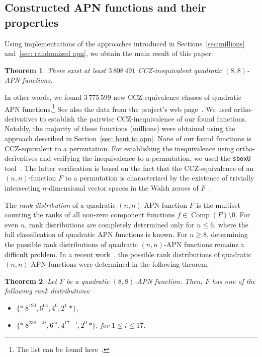 \documentclass{amsart}[11pt]
\theoremstyle{plain}
\newtheorem{theorem}{Theorem}[section]
\theoremstyle{definition}
\numberwithin{theorem}{section}
\numberwithin{equation}{section}
\numberwithin{table}{section}
\numberwithin{figure}{section}
\numberwithin{algorithm}{section}
\DeclareMathOperator{\comp}{Comp}
\begin{document}
\subsection{Constructed APN functions and their properties}\label{sec:constructed_apns}
Using implementations of the approaches introduced in Sections~\ref{sec:millions} and~\ref{sec: randomized apn}, we obtain the main result of this paper:

\begin{theorem}
    There exist at least $3\,808\,491$ CCZ-inequivalent quadratic $(8,8)$-APN functions.
\end{theorem}

In other words, we found $3\,775\,599$ new CCZ-equivalence classes of quadratic APN functions.\footnote{The list can be found here~\cite{dataset}.} See also the data from the project's web page~\cite{apn_project}. We used ortho-derivatives to establish the pairwise CCZ-inequivalence of our found functions.  Notably, the majority of these functions (millions) were obtained using the approach described in Section~\ref{sec: bent to apn}. None of our found functions is CCZ-equivalent to a permutation. For establishing the inequivalence using ortho-derivatives and verifying the inequivalence to a permutation, we used the \texttt{sboxU} tool~\cite{Perrin_sboxu}. The latter verification is based on the fact that the CCZ-equivalence of an $(n,n)$-function $F$ to a permutation is characterized by the existence of trivially intersecting $n$-dimensional vector spaces in the Walsh zeroes of $F$~\cite{perrin_equivalence_permutation,DBLP:journals/ccds/ChaseL22}.  

The \emph{rank distribution} of a quadratic $(n,n)$-APN function $F$ is the multiset counting the ranks of all non-zero component functions $f \in \comp(F)\setminus{0}$. For even $n$, rank distributions are completely determined only for $n \le 6$, where the full classification of quadratic APN functions is known. For $n \ge 8$, determining the possible rank distributions of quadratic $(n,n)$-APN functions remains a difficult problem. In a recent work~\cite{Koelsch2025}, the possible rank distributions of quadratic $(n,n)$-APN functions were determined in the following theorem.

\begin{theorem}\cite[{Theorem IV.5.}]{Koelsch2025}\label{th:rank_distributions}
    Let $F$ be a quadratic $(8,8)$-APN function. Then, $F$ has one of the following rank distributions:
\begin{itemize}
    \item $\{* \ 8^{190}, 6^{64}, 4^0, 2^{1} \ *\}$,
    \item $\{* \ 8^{238-4i}, 6^{5i}, 4^{17-i}, 2^0 \ *\}$, for $1\leq i\leq 17$.
\end{itemize}
\end{theorem}
\end{document}
